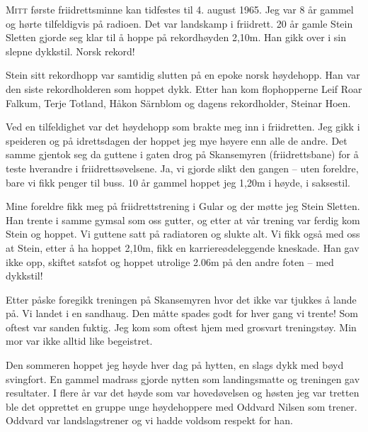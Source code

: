 
\lettrine[lines=3]{M}{itt} første friidrettsminne kan tidfestes til 4. august 1965. Jeg var 8 år gammel og hørte tilfeldigvis på radioen. Det var landskamp i friidrett. 20 år gamle Stein Sletten gjorde seg klar til å hoppe på rekordhøyden 2,10m. Han gikk over i sin slepne dykkstil. Norsk rekord!

Stein sitt rekordhopp var samtidig slutten på en epoke norsk høydehopp. Han var den siste rekordholderen som hoppet dykk. Etter han kom flophopperne Leif Roar Falkum, Terje Totland, Håkon Särnblom og dagens rekordholder, Steinar Hoen.

Ved en tilfeldighet var det høydehopp som brakte meg inn i friidretten. Jeg gikk i speideren og på idrettsdagen der hoppet jeg mye høyere enn alle de andre. Det samme gjentok seg da guttene i gaten drog på Skansemyren (friidrettsbane) for å teste hverandre i friidrettsøvelsene. Ja, vi gjorde slikt den gangen -- uten foreldre, bare vi fikk penger til buss. 10 år gammel hoppet jeg 1,20m i høyde, i saksestil.

Mine foreldre fikk meg på friidrettstrening i Gular og der møtte jeg Stein Sletten. Han trente i samme gymsal som oss gutter, og etter at vår trening var ferdig kom Stein og hoppet. Vi guttene satt på radiatoren og slukte alt. Vi fikk også med oss at Stein, etter å ha hoppet 2,10m, fikk en karriereødeleggende kneskade. Han gav ikke opp, skiftet satsfot og hoppet utrolige 2.06m på den andre foten -- med dykkstil!

Etter påske foregikk treningen på Skansemyren hvor det ikke var tjukkes å lande på. Vi landet i en sandhaug. Den måtte spades godt for hver gang vi trente! Som oftest var sanden fuktig. Jeg kom som oftest hjem med grosvart treningstøy. Min mor var ikke alltid like begeistret.

Den sommeren hoppet jeg høyde hver dag på hytten, en slags dykk med bøyd svingfort. En gammel madrass gjorde nytten som landingsmatte og treningen gav resultater. I flere år var det høyde som var hovedøvelsen og høsten jeg var tretten ble det opprettet en gruppe unge høydehoppere med Oddvard Nilsen som trener. Oddvard var landslagstrener og vi hadde voldsom respekt for han.

